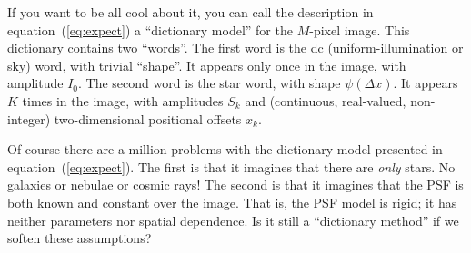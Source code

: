 \documentclass[12pt]{article}
\begin{document}
If you want to be all cool about it, you can call the description in
equation~(\ref{eq:expect}) a ``dictionary model'' for the $M$-pixel
image.
This dictionary contains two ``words''.
The first word is the dc (uniform-illumination or sky) word, with
trivial ``shape''.
It appears only once in the image, with amplitude $I_0$.
The second word is the star word, with shape $\psi(\Delta x)$.  It
appears $K$ times in the image, with amplitudes $S_k$ and (continuous,
real-valued, non-integer) two-dimensional positional offsets $x_k$.

Of course there are a million problems with the dictionary model
presented in equation~(\ref{eq:expect}).
The first is that it imagines that there are \emph{only} stars.
No galaxies or nebulae or cosmic rays!
The second is that it imagines that the PSF is both known and constant
over the image.
That is, the PSF model is rigid; it has neither parameters nor spatial
dependence.
Is it still a ``dictionary method'' if we soften these assumptions?
\end{document}
